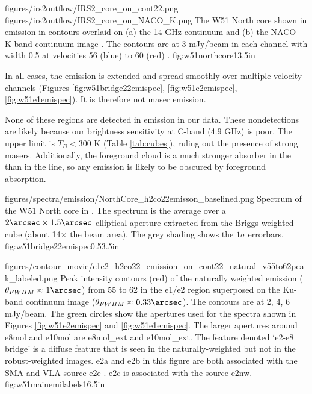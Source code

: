 \FigureTwo
{figures/irs2outflow/IRS2_core_on_cont22.png}
{figures/irs2outflow/IRS2_core_on_NACO_K.png}
{The W51 North core shown in \formaldehyde \twotwo emission in contours
overlaid on (a) the 14 GHz continuum and (b) the NACO K-band continuum image
\citep{Barbosa2008a}.  The contours are at 3 mJy/beam in each channel with
width 0.5 \kms at velocities 56 (blue) to 60 (red) \kms.
}
{fig:w51northcore}{1}{3.5in}

In all cases, the emission is extended and spread smoothly over multiple
velocity channels (Figures 
\ref{fig:w51bridge22emispec}, \ref{fig:w51e2emispec}, \ref{fig:w51e1emispec}).
It is therefore not maser emission.

None of these regions are detected in \oneone emission in our data.  These
nondetections are likely because our brightness sensitivity at C-band (4.9 GHz)
is poor.  The upper limit is $T_B<300$ K (Table \ref{tab:cubes}), ruling
out the presence of strong masers.  Additionally, the foreground cloud is a
much stronger absorber in the \oneone than in the \twotwo line, so any emission
is likely to be obscured by foreground absorption.


\Figure
{{figures/spectra/emission/NorthCore_h2co22emisson_baselined}.png}
{Spectrum of the W51 North core in \ortho \twotwo.  The spectrum
is the average over a $2\arcsec\times1.5\arcsec$ elliptical aperture extracted
from the Briggs-weighted cube (about 14$\times$ the beam area).  The grey
shading shows the $1\sigma$
errorbars.
}
{fig:w51bridge22emispec}{0.5}{3.5in}

\Figure
{figures/contour_movie/e1e2_h2co22_emission_on_cont22_natural_v55to62peak_labeled.png}
{ Peak intensity contours (red) of the naturally weighted \formaldehyde \twotwo
emission ($\theta_{FWHM}\approx1\arcsec$) from 55 to 62 \kms in the e1/e2
region superposed on the Ku-band continuum image
($\theta_{FWHM}\approx0.33\arcsec$).  The contours are at 2, 4, 6
mJy/beam.  The green circles show
the apertures used for the spectra shown in Figures
\ref{fig:w51e2emispec} and
\ref{fig:w51e1emispec}.  The larger apertures around e8mol and e10mol are
e8mol\_ext and e10mol\_ext.  The feature denoted `e2-e8 bridge' is a diffuse
feature that is seen in the naturally-weighted but not in the robust-weighted
images.  e2a and e2b in this figure are both associated with
the SMA and VLA source e2e \citep{Shi2010a,Goddi2016a}.  e2c is associated with
the source e2nw.
}{fig:w51mainemilabels}{1}{6.5in}

